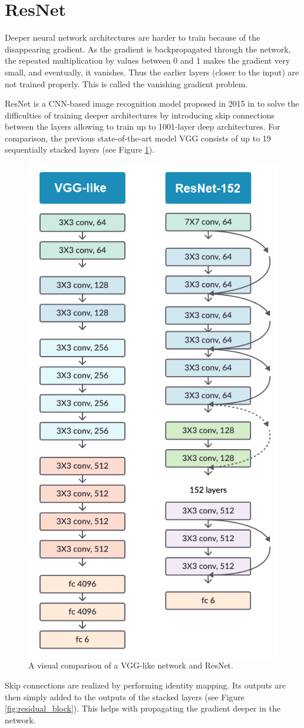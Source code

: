 \section{ResNet}
Deeper neural network architectures are harder to train because of the disappearing gradient. As the gradient is backpropagated through the network, the repeated multiplication by values between 0 and 1 makes the gradient very small, and eventually, it vanishes. Thus the earlier layers (closer to the input) are not trained properly. This is called the vanishing gradient problem. 

ResNet is a CNN-based image recognition model proposed in 2015 in \cite{resnet} to solve the difficulties of training deeper architectures by introducing skip connections between the layers allowing to train up to 1001-layer deep architectures. For comparison, the previous state-of-the-art model VGG \cite{vgg} consists of up to 19 sequentially stacked layers (see Figure \ref{fig:vgg_resnet}).

\begin{figure}[h]
    \centering
    \includegraphics[width=0.4\linewidth]{Sources/Figures/vgg_resnet.png}
    \caption{A visual comparison of a VGG-like network and ResNet.}
    \label{fig:vgg_resnet}
\end{figure}

Skip connections are realized by performing identity mapping. Its outputs are then simply added to the outputs of the stacked layers (see Figure \ref{fig:residual_block}). This helps with propagating the gradient deeper in the network. 

